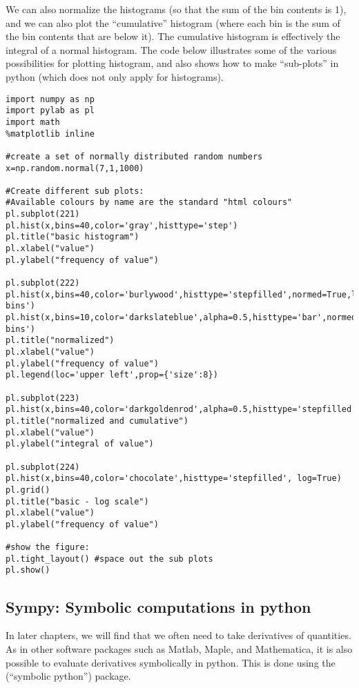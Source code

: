 We can also normalize the histograms (so that the sum of the bin contents is 1), and we can also plot the ``cumulative'' histogram (where each bin is the sum of the bin contents that are below it). The cumulative histogram is effectively the integral of a normal histogram. The code below illustrates some of the various possibilities for plotting histogram, and also shows how to make ``sub-plots'' in python (which does not only apply for histograms).
\begin{lstlisting}[frame=single] 
import numpy as np
import pylab as pl
import math 
%matplotlib inline

#create a set of normally distributed random numbers
x=np.random.normal(7,1,1000)

#Create different sub plots:
#Available colours by name are the standard "html colours"
pl.subplot(221)
pl.hist(x,bins=40,color='gray',histtype='step')
pl.title("basic histogram")
pl.xlabel("value")
pl.ylabel("frequency of value")

pl.subplot(222)
pl.hist(x,bins=40,color='burlywood',histtype='stepfilled',normed=True,label='40 bins')
pl.hist(x,bins=10,color='darkslateblue',alpha=0.5,histtype='bar',normed=True,label='10 bins')
pl.title("normalized")
pl.xlabel("value")
pl.ylabel("frequency of value")
pl.legend(loc='upper left',prop={'size':8})

pl.subplot(223)
pl.hist(x,bins=40,color='darkgoldenrod',alpha=0.5,histtype='stepfilled',normed=True,cumulative=True)
pl.title("normalized and cumulative")
pl.xlabel("value")
pl.ylabel("integral of value")

pl.subplot(224)
pl.hist(x,bins=40,color='chocolate',histtype='stepfilled', log=True)
pl.grid()
pl.title("basic - log scale")
pl.xlabel("value")
pl.ylabel("frequency of value")

#show the figure:
pl.tight_layout() #space out the sub plots
pl.show()
\end{lstlisting}

\subsection{Sympy: Symbolic computations in python}
In later chapters, we will find that we often need to take derivatives of quantities. As in other software packages such as Matlab, Maple, and Mathematica, it is also possible to evaluate derivatives symbolically in python. This is done using the  (``symbolic python'') package. 

